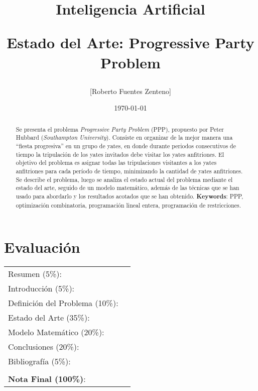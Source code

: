\documentclass[letter, 10pt]{article}
\begin{document}
\title{Inteligencia Artificial \\ \begin{Large}Estado del Arte: Progressive Party Problem\end{Large}}
\author{[Roberto Fuentes Zenteno]}
\date{\today}
\maketitle


\section*{Evaluaci\'on}

\begin{tabular}{ll}
Resumen (5\%): & \underline{\hspace{2cm}} \\
Introducci\'on (5\%):  & \underline{\hspace{2cm}} \\
Definici\'on del Problema (10\%):  & \underline{\hspace{2cm}} \\
Estado del Arte (35\%):  & \underline{\hspace{2cm}} \\
Modelo Matem\'atico (20\%): &  \underline{\hspace{2cm}}\\
Conclusiones (20\%): &  \underline{\hspace{2cm}}\\
Bibliograf\'ia (5\%): & \underline{\hspace{2cm}}\\
 &  \\
\textbf{Nota Final (100\%)}:   & \underline{\hspace{2cm}}
\end{tabular}
\vspace{2cm}


\begin{abstract}
Se presenta el problema \textit{Progressive Party Problem} (PPP), propuesto por Peter Hubbard (\textit{Southampton
University}). Consiste en organizar de la mejor manera una ``fiesta progresiva'' en un grupo de yates, en donde durante periodos consecutivos de tiempo la tripulación de los yates invitados debe visitar los yates anfitriones. El objetivo del problema es asignar todas las tripulaciones visitantes a los yates anfitriones para cada período de tiempo, minimizando la cantidad de yates anfitriones. Se describe el problema, luego se analiza el estado actual del problema mediante el estado del arte, seguido de un modelo matemático, además de las técnicas que se han usado para abordarlo y los resultados acotados que se han obtenido. 
\textbf{Keywords}: PPP, optimización combinatoria, programación lineal entera, programación de restricciones.
\end{abstract}
\end{document}
